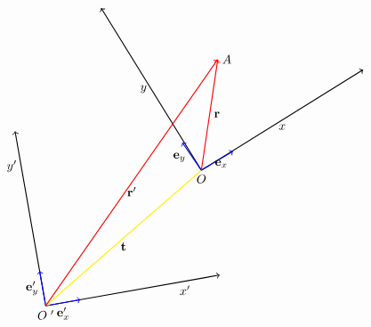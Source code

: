 \documentclass[12pt]{article}
\numberwithin{equation}{section}
\begin{document}
\begin{equation}\label{changingofcartesiancoordinates1}
\begin{tikzpicture} [rotate=10]
\draw 
[ <-> , thick] 
(5,0)--(0,0)--(0,5);

\draw [thick, ->,blue] (0,0)--(1,0);
\node [below] at (0.5,0) {$\e'_x$};

\draw [thick, ->,blue] (0,0)--(0,1);
\node [left] at (0,0.5) {$\e'_y$};

\node [left] at (0,4) {$y'$};
\node [below] at (4,0) {$x'$};

\node [below] at (0,0) {$O^{\,\,\prime}$};

\draw 
[ <-> , thick] 
(3,8)--(5,3)--(10,5);


\draw [thick, ->,blue] (5,3)--(170pt,96pt);
\node [below] at (160pt,94pt) {$\e_x$};


\draw [thick, ->,blue] (5,3)--(131pt,110pt);
\node [left] at (135pt, 97pt) {$\e_y$};


\node [left] at (4,5.5) {$y$};
\node [below] at (7.5,4) {$x$};
\node [below] at (5,3) {$O$};


\draw [thick, yellow,->] (5,3)--(0,0);
\draw [thick, red,->] (0,0)--(6,6);
\draw [thick, red,->] (5,3)--(6,6);

\node [right] at (6,6) {$A$};
\node [below] at (2.5,1.5) {$\bf t$};
\node [below] at (3,3) {$\r'$};
\node [right] at (5.5,4.5) {$\r$};



\end{tikzpicture}
\end{equation}
\end{document}
